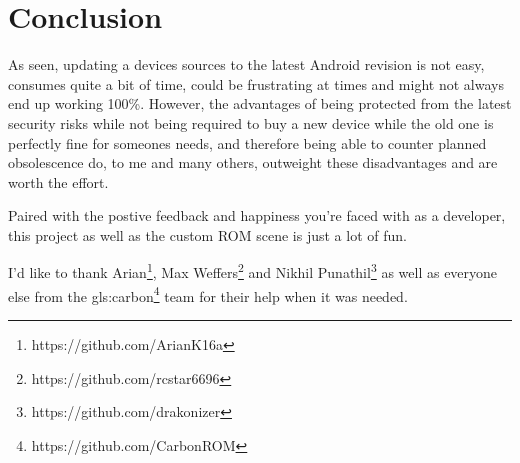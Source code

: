 
\section{Conclusion}
\label{ch:Conclusion}

As seen, updating a devices sources to the latest Android revision is not easy, consumes quite a bit of time, could be frustrating at times and might not always end up working 100\%.
However, the advantages of being protected from the latest security risks while not being required to buy a new device while the old one is perfectly fine for someones needs,
and therefore being able to counter planned obsolescence do, to me and many others, outweight these disadvantages and are worth the effort.

Paired with the postive feedback and happiness you're faced with as a developer, this project as well as the custom ROM scene is just a lot of fun.

I'd like to thank Arian\footnote{https://github.com/ArianK16a}, Max Weffers\footnote{https://github.com/rcstar6696} and Nikhil Punathil\footnote{https://github.com/drakonizer} as well as everyone else from the \gls{gls:carbon}\footnote{https://github.com/CarbonROM} team for their help when it was needed.